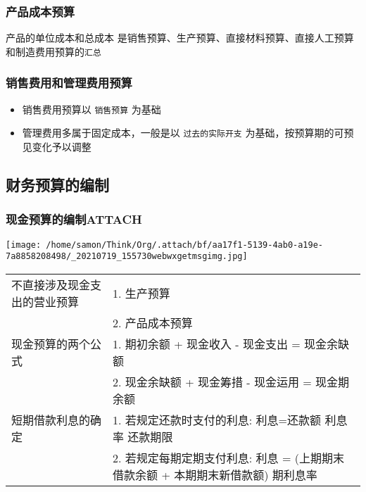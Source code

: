 \documentclass[11pt]{article}
\begin{document}
\subsubsection{产品成本预算}
\label{sec:org72297c7}
产品的单位成本和总成本
是销售预算、生产预算、直接材料预算、直接人工预算和制造费用预算的\texttt{汇总}
\subsubsection{销售费用和管理费用预算}
\label{sec:org52f06c9}
\begin{itemize}
\item 销售费用预算以 \texttt{销售预算} 为基础
\item 管理费用多属于固定成本，一般是以 \texttt{过去的实际开支} 为基础，按预算期的可预见变化予以调整
\end{itemize}
\subsection{财务预算的编制}
\label{sec:orgb030bba}
\subsubsection{现金预算的编制\hfill{}\textsc{ATTACH}}
\label{sec:org95e520d}
\begin{center}
\texttt{[image: /home/samon/Think/Org/.attach/bf/aa17f1-5139-4ab0-a19e-7a8858208498/\_20210719\_155730webwxgetmsgimg.jpg]}
\end{center}
\begin{center}
\begin{tabular}{ll}
不直接涉及现金支出的营业预算 & 1. 生产预算\\
 & 2. 产品成本预算\\
\hline
现金预算的两个公式 & 1. 期初余额 + 现金收入 - 现金支出 = 现金余缺额\\
 & 2. 现金余缺额 + 现金筹措 - 现金运用 = 现金期余额\\
\hline
短期借款利息的确定 & 1. 若规定还款时支付的利息: 利息=还款额 \texttimes{} 利息率 \texttimes{} 还款期限\\
 & 2. 若规定每期定期支付利息: 利息 = (上期期末借款余额 + 本期期末新借款额)\texttimes{} 期利息率\\
\end{tabular}
\end{center}
\end{document}
